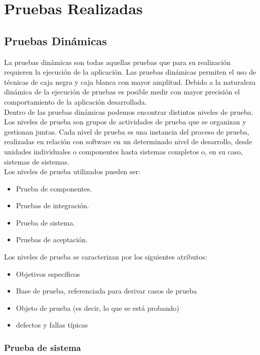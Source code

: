 \chapter{Pruebas Realizadas} \label{cap:ocho}
\section{Pruebas Dinámicas}

La pruebas dinámicas son todas aquellas pruebas que para su realización requieren la ejecución de la aplicación. Las pruebas dinámicas permiten el uso de técnicas de caja negra y caja blanca con mayor amplitud. Debido a la naturaleza dinámica de la ejecución de pruebas es posible medir con mayor precisión el comportamiento de la aplicación desarrollada.\\

Dentro de las pruebas dinámicas podemos encontrar distintos niveles de prueba. Los niveles de prueba son grupos de actividades de prueba que se organizan y gestionan juntas. Cada nivel de prueba es una instancia del proceso de prueba, realizadas en relación con software en un determinado nivel de desarrollo, desde unidades individuales o componentes hasta sistemas completos o, en su caso, sistemas de sistemas.\\

Los niveles de prueba utilizados pueden ser:

\begin{itemize}
	\item Prueba de componentes.
	\item Pruebas de integración.
	\item Prueba de sistema.
	\item Pruebas de aceptación.
\end{itemize}

Los niveles de prueba se caracterizan por los siguientes atributos:

\begin{itemize}
	\item Objetivos específicos
	\item Base de prueba, referenciada para derivar casos de prueba
	\item Objeto de prueba (es decir, lo que se está probando)
	\item defectos y fallas típicas
\end{itemize}

\subsection{Prueba de sistema}


